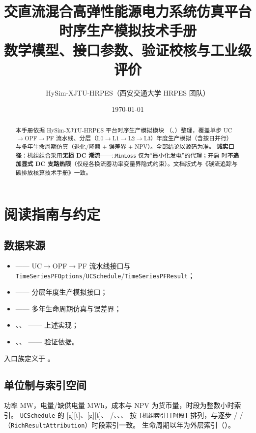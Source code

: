 \documentclass[UTF8,fontset=fandol,a4paper,11pt]{ctexart}
\title{\textbf{交直流混合高弹性能源电力系统仿真平台}\\[0.5em]
       {\Large 时序生产模拟技术手册}\\[0.3em]
       {\large 数学模型、接口参数、验证校核与工业级评价}}
\author{HySim-XJTU-HRPES（西安交通大学 HRPES 团队）}
\date{\today}
\begin{document}
\maketitle
\begin{abstract}
\noindent 本手册依据 HySim-XJTU-HRPES 平台时序生产模拟模块
（、）整理，覆盖单步
UC$\to$OPF$\to$PF 流水线、分层（L0$\to$L1$\to$L2$\to$L3）年度生产模拟（含按日并行）
与多年生命周期仿真（退化/降额 + 误差界 + NPV）。全部结论以源码为准。
\textbf{诚实口径}：机组组合采用\textbf{无损 DC 潮流}——::\texttt{MinLoss}
仅为“最小化发电”的代理；开启  时\textbf{不追加显式
DC 支路热限}（仅经各换流器功率变量界隐式约束）。文档版式与《碳流追踪与碳排放核算技术手册》一致。
\end{abstract}

\tableofcontents
\newpage

\section{阅读指南与约定}
\subsection{数据来源}
\begin{itemize}
  \item {} —— UC$\to$OPF$\to$PF 流水线接口与
        \texttt{TimeSeriesPFOptions}/\texttt{UCSchedule}/\texttt{TimeSeriesPFResult}；
  \item {} —— 分层年度生产模拟接口；
  \item {} —— 多年生命周期仿真与误差界；
  \item {}、、
         —— 上述实现；
  \item {}、、
         —— 验证依据。
\end{itemize}
入口族定义于 。

\subsection{单位制与索引空间}
功率 MW，电量/缺供电量 MWh，成本与 NPV 为货币量，时段为整数小时索引。
\texttt{UCSchedule} 的 [g][t]、[g][t]、
/、、、
 按 \texttt{[机组索引][时段]} 排列，与逐步 /
/（\texttt{RichResultAttribution}）时段索引一致。
生命周期以年为外层索引（）。
\end{document}
